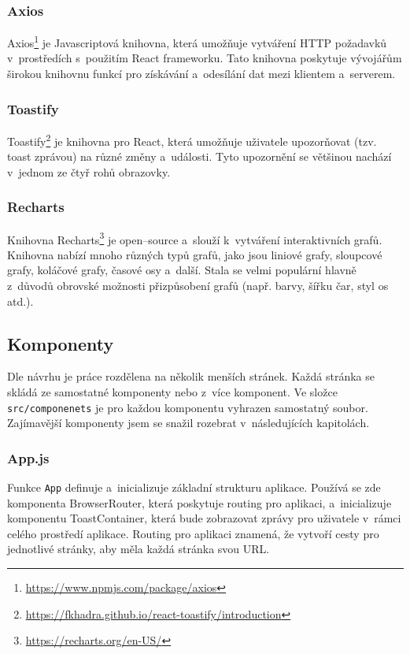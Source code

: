 \subsubsection{Axios}
Axios\footnote{\url{https://www.npmjs.com/package/axios}} je Javascriptová knihovna, která umožňuje vytváření HTTP požadavků v~prostředích s~použitím React frameworku. Tato knihovna poskytuje vývojářům širokou knihovnu funkcí pro získávání a~odesílání dat mezi klientem a~serverem. 

\subsubsection{Toastify}
Toastify\footnote{\url{https://fkhadra.github.io/react-toastify/introduction}} je knihovna pro React, která umožňuje uživatele upozorňovat (tzv. toast zprávou) na různé změny a~události. Tyto upozornění se většinou nachází v~jednom ze čtyř rohů obrazovky.

\subsubsection{Recharts}
Knihovna Recharts\footnote{\url{https://recharts.org/en-US/}} je open--source a~slouží k~vytváření interaktivních grafů. Knihovna nabízí mnoho různých typů grafů, jako jsou liniové grafy, sloupcové grafy, koláčové grafy, časové osy a~další. Stala se velmi populární hlavně z~důvodů obrovské možnosti přizpůsobení grafů (např. barvy, šířku čar, styl os atd.).

\subsection{Komponenty}
Dle návrhu je práce rozdělena na několik menších stránek. Každá stránka se skládá ze samostatné komponenty nebo z~více komponent. 
Ve složce \texttt{src/componenets} je pro každou komponentu vyhrazen samostatný soubor.
Zajímavější komponenty jsem se snažil rozebrat v~následujících kapitolách.

\subsubsection{App.js}

Funkce \texttt{App} definuje a~inicializuje základní strukturu aplikace. Používá se zde komponenta BrowserRouter, která poskytuje routing pro aplikaci, a~inicializuje komponentu ToastContainer, která bude zobrazovat zprávy pro uživatele v~rámci celého prostředí aplikace. Routing pro aplikaci znamená, že vytvoří cesty pro jednotlivé stránky, aby měla každá stránka svou URL.
